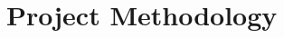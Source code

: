 \documentclass[../PhD_Dissertation.tex]{subfiles}
\begin{document}
\chapter[Project Methodology]{Project Methodology}
\label{Chap:methodology}	%

\end{document}
